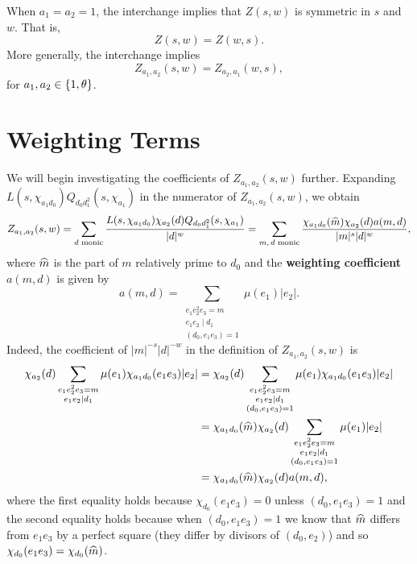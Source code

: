 \documentclass[12pt,reqno,oneside]{amsart}
\begin{document}
    \begin{remark}\label{rem:symmetry_of_Double_Dirichlet_series}
        When $a_{1} = a_{2} = 1$, the interchange implies that $Z(s,w)$ is symmetric in $s$ and $w$. That is,
        \[
            Z(s,w) = Z(w,s).
        \]
        More generally, the interchange implies
        \[
            Z_{a_{1},a_{2}}(s,w) = Z_{a_{2},a_{1}}(w,s), 
        \]
        for $a_{1},a_{2} \in \{1,\theta\}$.
    \end{remark}
\section{Weighting Terms}
    We will begin investigating the coefficients of $Z_{a_{1},a_{2}}(s,w)$ further. Expanding $L(s,\chi_{a_{1}d_{0}})Q_{d_{0}d_{1}^{2}}(s,\chi_{a_{1}})$ in the numerator of $Z_{a_{1},a_{2}}(s,w)$, we obtain
    \[
        Z_{a_{1},a_{2}}(s,w) = \sum_{\text{$d$ monic}}\frac{L(s,\chi_{a_{1}d_{0}})\chi_{a_{2}}(d)Q_{d_{0}d_{1}^{2}}(s,\chi_{a_{1}})}{|d|^{w}} = \sum_{\text{$m,d$ monic}}\frac{\chi_{a_{1}d_{0}}(\widehat{m})\chi_{a_{2}}(d)a(m,d)}{|m|^{s}|d|^{w}},
    \]
    where $\widehat{m}$ is the part of $m$ relatively prime to $d_{0}$ and the \textbf{weighting coefficient} $a(m,d)$ is given by
    \[
        a(m,d) = \sum_{\substack{e_{1}e_{2}^{2}e_{3} = m \\ e_{1}e_{2} \mid d_{1} \\ (d_{0},e_{1}e_{3}) = 1}}\mu(e_{1})|e_{2}|.
    \]
    Indeed, the coefficient of $|m|^{-s}|d|^{-w}$ in the definition of $Z_{a_{1},a_{2}}(s,w)$ is
    \begin{align*}
        \chi_{a_{2}}(d)\sum_{\substack{e_{1}e_{2}^{2}e_{3} = m \\ e_{1}e_{2} \mid d_{1}}}\mu(e_{1})\chi_{a_{1}d_{0}}(e_{1}e_{3})|e_{2}| &= \chi_{a_{2}}(d)\sum_{\substack{e_{1}e_{2}^{2}e_{3} = m \\ e_{1}e_{2} \mid d_{1} \\ (d_{0},e_{1}e_{3}) = 1}}\mu(e_{1})\chi_{a_{1}d_{0}}(e_{1}e_{3})|e_{2}| \\
        &= \chi_{a_{1}d_{0}}(\widehat{m})\chi_{a_{2}}(d)\sum_{\substack{e_{1}e_{2}^{2}e_{3} = m \\ e_{1}e_{2} \mid d_{1} \\ (d_{0},e_{1}e_{3}) = 1}}\mu(e_{1})|e_{2}| \\
        &= \chi_{a_{1}d_{0}}(\widehat{m})\chi_{a_{2}}(d)a(m,d),
    \end{align*}
    where the first equality holds because $\chi_{d_{0}}(e_{1}e_{3}) = 0$ unless $(d_{0},e_{1}e_{3}) = 1$ and the second equality holds because when $(d_{0},e_{1}e_{3}) = 1$ we know that $\widehat{m}$ differs from $e_{1}e_{3}$ by a perfect square (they differ by divisors of $(d_{0},e_{2})$) and so $\chi_{d_{0}}(e_{1}e_{3}) = \chi_{d_{0}}(\widehat{m})$. 
    
\end{document}
